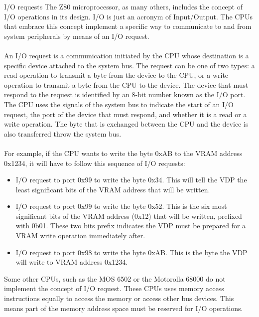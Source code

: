 \begin{theory}{I/O requests}
	The Z80 microprocessor, as many others, includes the concept of I/O operations in its design. I/O is just an acronym of Input/Output. The CPUs that embrace this concept implement a specific way to communicate to and from system peripherals by means of an I/O request.\\\\ 
	
	An I/O request is a communication initiated by the CPU whose destination is a specific device attached to the system bus. The request can be one of two types: a read operation to transmit a byte from the device to the CPU, or a write operation to transmit a byte from the CPU to the device. The device that must respond to the request is identified by an 8-bit number known as the I/O port. The CPU uses the signals of the system bus to indicate the start of an I/O request, the port of the device that must respond, and whether it is a read or a write operation. The byte that is exchanged between the CPU and the device is also transferred throw the system bus. \\\\
	
	For example, if the CPU wants to write the byte 0xAB to the VRAM address 0x1234, it will have to follow this sequence of I/O requests:
	
	\begin{itemize}
		\item I/O request to port 0x99 to write the byte 0x34. This will tell the VDP the least significant bits of the VRAM address that will be written.
		\item I/O request to port 0x99 to write the byte 0x52. This is the six most significant bits of the VRAM address (0x12) that will be written, prefixed with 0b01. These two bits prefix indicates the VDP must be prepared for a VRAM write operation immediately after.
		\item I/O request to port 0x98 to write the byte 0xAB. This is the byte the VDP will write to VRAM address 0x1234.
	\end{itemize}
	
	Some other CPUs, such as the MOS 6502 or the Motorolla 68000 do not implement the concept of I/O request. These CPUs uses memory access instructions equally to access the memory or access other bus devices. This means part of the memory address space must be  reserved for I/O operations. 	
\end{theory}

